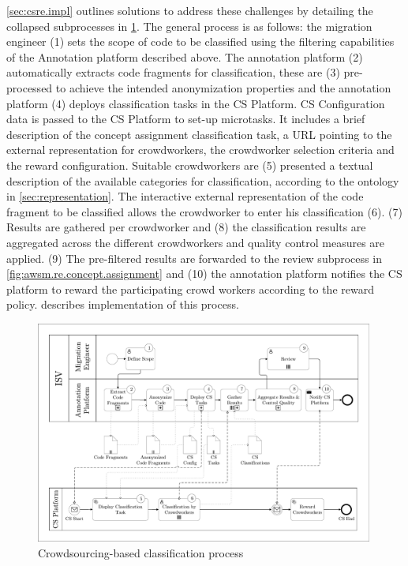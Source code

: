 \cref{sec:csre.impl} outlines solutions to address these challenges by detailing the collapsed subprocesses in \cref{fig:crowdprocess}.
The general process is as follows: the migration engineer (1) sets the scope of code to be classified using the filtering capabilities of the Annotation platform described above.
The annotation platform (2) automatically extracts code fragments for classification, these are (3) pre-processed to achieve the intended anonymization properties and the annotation platform (4) deploys classification tasks in the CS Platform.
CS Configuration data is passed to the CS Platform to set-up microtasks.
It includes a brief description of the concept assignment classification task, a URL pointing to the external representation for crowdworkers, the crowdworker selection criteria and the reward configuration.
Suitable crowdworkers are (5) presented a textual description of the available categories for classification, according to the ontology in \cref{sec:representation}.
The interactive external representation of the code fragment to be classified allows the crowdworker to enter his classification (6).
(7) Results are gathered per crowdworker and (8) the classification results are aggregated across the different crowdworkers and quality control measures are applied.
(9) The pre-filtered results are forwarded to the review subprocess in \cref{fig:awsm.re.concept.assignment} and (10) the annotation platform notifies the CS platform to reward the participating crowd workers according to the reward policy.
 describes implementation of this process.

\begin{figure}
\hypertarget{fig:crowdprocess}{%
\centering
\includegraphics[width=0.99\textwidth]{../figures/crowdprocess.pdf}
\caption{Crowdsourcing-based classification process \autocite[adapted from][]{Heil2019CSRECCIS}}\label{fig:crowdprocess}
}
\end{figure}

